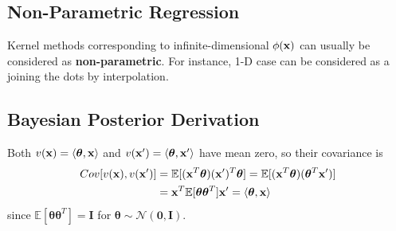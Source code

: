 \subsection{Non-Parametric Regression}
Kernel methods corresponding to infinite-dimensional $\phi({\mathbf{x}})$ can usually be considered as \textbf{non-parametric}.
For instance, 1-D case can be considered as a joining the dots by interpolation. 

\subsection{Bayesian Posterior Derivation}

Both $v({\mathbf{x}}) = \langle \boldsymbol{\theta}, {\mathbf{x}} \rangle$ and $v({\mathbf{x}}') = \langle \boldsymbol{\theta}, {\mathbf{x}}' \rangle$ have mean zero, so their covariance is 
\begin{align*}
	Cov[v({\mathbf{x}}), v({\mathbf{x}}')] &= \mathbb{E}[({\mathbf{x}}^T\boldsymbol{\theta})({\mathbf{x}}')^T\boldsymbol{\theta}] = \mathbb{E}[({\mathbf{x}}^T\boldsymbol{\theta})(\boldsymbol{\theta}^T{\mathbf{x}}')]\\
						   &= {\mathbf{x}}^T\mathbb{E}[\boldsymbol{\theta}\boldsymbol{\theta}^T]{\mathbf{x}}' = \langle \boldsymbol{\theta}, {\mathbf{x}} \rangle
\end{align*}
since $\mathbb{E}[\boldsymbol{\theta}\boldsymbol{\theta}^T] = \mathbf{I}$ for $\boldsymbol{\theta}\sim \mathcal{N}(\mathbf{0}, \mathbf{I})$. 













